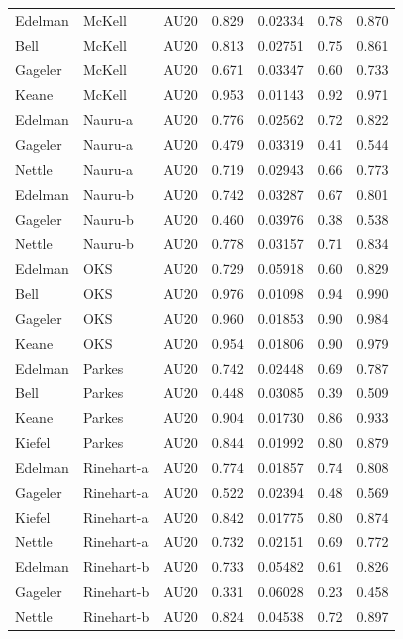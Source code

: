 \documentclass{monashthesis}
\begin{document}
\begin{center}
\begin{longtable}{lllllll}
Edelman & McKell & AU20 & 0.829 & 0.02334 & 0.78 & 0.870 \\
Bell & McKell & AU20 & 0.813 & 0.02751 & 0.75 & 0.861 \\
Gageler & McKell & AU20 & 0.671 & 0.03347 & 0.60 & 0.733 \\
Keane & McKell & AU20 & 0.953 & 0.01143 & 0.92 & 0.971 \\
Edelman & Nauru-a & AU20 & 0.776 & 0.02562 & 0.72 & 0.822 \\
Gageler & Nauru-a & AU20 & 0.479 & 0.03319 & 0.41 & 0.544 \\
Nettle & Nauru-a & AU20 & 0.719 & 0.02943 & 0.66 & 0.773 \\
Edelman & Nauru-b & AU20 & 0.742 & 0.03287 & 0.67 & 0.801 \\
Gageler & Nauru-b & AU20 & 0.460 & 0.03976 & 0.38 & 0.538 \\
Nettle & Nauru-b & AU20 & 0.778 & 0.03157 & 0.71 & 0.834 \\
Edelman & OKS & AU20 & 0.729 & 0.05918 & 0.60 & 0.829 \\
Bell & OKS & AU20 & 0.976 & 0.01098 & 0.94 & 0.990 \\
Gageler & OKS & AU20 & 0.960 & 0.01853 & 0.90 & 0.984 \\
Keane & OKS & AU20 & 0.954 & 0.01806 & 0.90 & 0.979 \\
Edelman & Parkes & AU20 & 0.742 & 0.02448 & 0.69 & 0.787 \\
Bell & Parkes & AU20 & 0.448 & 0.03085 & 0.39 & 0.509 \\
Keane & Parkes & AU20 & 0.904 & 0.01730 & 0.86 & 0.933 \\
Kiefel & Parkes & AU20 & 0.844 & 0.01992 & 0.80 & 0.879 \\
Edelman & Rinehart-a & AU20 & 0.774 & 0.01857 & 0.74 & 0.808 \\
Gageler & Rinehart-a & AU20 & 0.522 & 0.02394 & 0.48 & 0.569 \\
Kiefel & Rinehart-a & AU20 & 0.842 & 0.01775 & 0.80 & 0.874 \\
Nettle & Rinehart-a & AU20 & 0.732 & 0.02151 & 0.69 & 0.772 \\
Edelman & Rinehart-b & AU20 & 0.733 & 0.05482 & 0.61 & 0.826 \\
Gageler & Rinehart-b & AU20 & 0.331 & 0.06028 & 0.23 & 0.458 \\
Nettle & Rinehart-b & AU20 & 0.824 & 0.04538 & 0.72 & 0.897 \\
\end{longtable}
\end{center}
\end{document}
